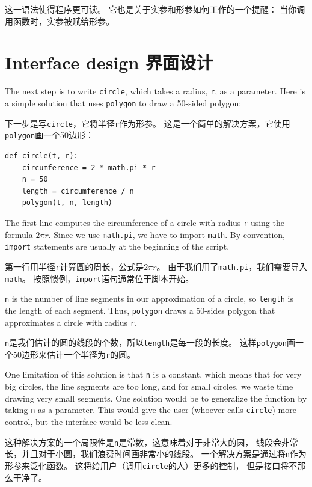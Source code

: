 \documentclass[10pt]{book}
\begin{document}
\begin{CJK}{UTF8}{gbsn}
这一语法使得程序更可读。
它也是关于实参和形参如何工作的一个提醒：
当你调用函数时，实参被赋给形参。


\section{Interface design 界面设计}

The next step is to write {\tt circle}, which takes a radius,
{\tt r}, as a parameter.  Here is a simple solution that uses
{\tt polygon} to draw a 50-sided polygon:

下一步是写{\tt circle}，它将半径{\tt r}作为形参。
这是一个简单的解决方案，它使用{\tt polygon}画一个50边形：

\begin{verbatim}
def circle(t, r):
    circumference = 2 * math.pi * r
    n = 50
    length = circumference / n
    polygon(t, n, length)
\end{verbatim}
%
The first line computes the circumference of a circle with radius
{\tt r} using the formula $2 \pi r$.  Since we use {\tt math.pi}, we
have to import {\tt math}.  By convention, {\tt import} statements
are usually at the beginning of the script.

第一行用半径{\tt r}计算圆的周长，公式是$2 \pi r$。
由于我们用了{\tt math.pi}，我们需要导入{\tt math}。
按照惯例，{\tt import}语句通常位于脚本开始。

{\tt n} is the number of line segments in our approximation of a circle,
so {\tt length} is the length of each segment.  Thus, {\tt polygon}
draws a 50-sides polygon that approximates a circle with radius {\tt r}.

{\tt n}是我们估计的圆的线段的个数，所以{\tt length}是每一段的长度。
这样{\tt polygon}画一个50边形来估计一个半径为{\tt r}的圆。

One limitation of this solution is that {\tt n} is a constant, which
means that for very big circles, the line segments are too long, and
for small circles, we waste time drawing very small segments.  One
solution would be to generalize the function by taking {\tt n} as
a parameter.  This would give the user (whoever calls {\tt circle})
more control, but the interface would be less clean.

这种解决方案的一个局限性是{\tt n}是常数，这意味着对于非常大的圆，
线段会非常长，并且对于小圆，我们浪费时间画非常小的线段。
一个解决方案是通过将{\tt n}作为形参来泛化函数。
这将给用户（调用{\tt circle}的人）更多的控制，
但是接口将不那么干净了。


\end{CJK}
\end{document}
